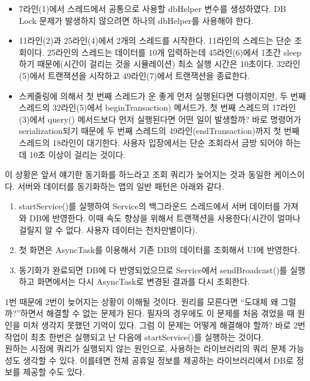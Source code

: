 \begin{itemize}
\item 7라인(1)에서 스레드에서 공통으로 사용할 dbHelper 변수를 생성하였다. DB Lock 문제가 발생하지 않으려면 하나의 dbHelper를 사용해야 한다.
\item 11라인(2)과 25라인(4)에서 2개의 스레드를 시작한다.
11라인의 스레드는 단순 조회이다.
25라인의 스레드는 데이터를 10개 입력하는데 45라인(6)에서 1초간 sleep하기 때문에(시간이 걸리는 것을 시뮬레이션) 최소 실행 시간은 10초이다. 32라인(5)에서 트랜잭션을 시작하고 49라인(7)에서 트랜잭션을 종료한다.
\item 스케줄링에 의해서 첫 번째 스레드가 운 좋게 먼저 실행된다면 다행이지만, 두 번째 스레드의 32라인(5)에서 beginTransaction) 메서드가, 첫 번째 스레드의 17라인(3)에서 query() 메서드보다 먼저 실행된다면 어떤 일이 발생할까? 바로 명령어가 serialization되기 때문에 두 번째 스레드의 49라인(endTransaction)까지 첫 번째 스레드의 18라인이 대기한다. 사용자 입장에서는 단순 조회라서 금방 되어야 하는데 10초 이상이 걸리는 것이다. 
\end{itemize}

이 상황은 앞서 얘기한 동기화를 하느라고 조회 쿼리가 늦어지는 것과 동일한 케이스이다. 
서버와 데이터를 동기화하는 앱의 일반 패턴은 아래와 같다.
\begin{enumerate}
\item startService()를 실행하여 Service의 백그라운드 스레드에서 서버 데이터를 가져와 DB에 반영한다. 이때 속도 향상을 위해서 트랜잭션을 사용한다(시간이 얼마나 걸릴지 알 수 없다. 사용자 데이터는 천차만별이다).
\item 첫 화면은 AsyncTask를 이용해서 기존 DB의 데이터를 조회해서 UI에 반영한다. 
\item 동기화가 완료되면 DB에 다 반영되었으므로 Service에서 sendBroadcast()를 실행하고 화면에서는 다시 AsyncTask로 변경된 결과를 다시 조회한다.
\end{enumerate}

1번 때문에 2번이 늦어지는 상황이 이해될 것이다. 원리를 모른다면 ``도대체 왜 그럴까?''하면서 해결할 수 없는 문제가 된다. 
필자의 경우에도 이 문제를 처음 겪었을 때 원인을 미처 생각지 못했던 기억이 있다. 그럼 이 문제는 어떻게 해결해야 할까? 바로 2번 작업이 최초 한번은 실행되고 난 다음에 startService()를 실행하는 것이다.\\

원하는 시점에 쿼리가 실행되지 않는 원인으로, 사용하는 라이브러리의 쿼리 문제 가능성도 생각할 수 있다. 이를테면 전체 공휴일 정보를 제공하는 라이브러리에서 DB로 정보를 제공할 수도 있다.\\

